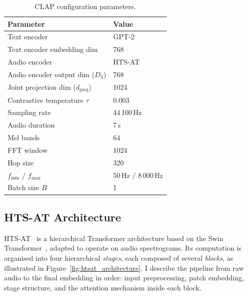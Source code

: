 \begin{table}[h]
\centering
\caption{CLAP configuration parameters.}
\label{tab:clap_config}
\begin{tabular}{ll}
\toprule
\textbf{Parameter} & \textbf{Value} \\
\midrule
Text encoder                               & GPT-2 \\
Text encoder embedding dim                 & 768 \\
Audio encoder                              & HTS-AT \\
Audio encoder output dim ($D_3$)           & 768 \\
Joint projection dim ($d_{\mathrm{proj}}$) & 1024 \\
Contrastive temperature $\tau$             & 0.003 \\
Sampling rate                              & 44\,100\,Hz \\
Audio duration                             & 7\,s \\
Mel bands                                  & 64 \\
FFT window                                 & 1024 \\
Hop size                                   & 320 \\
$f_{\min}$ / $f_{\max}$                    & 50\,Hz / 8\,000\,Hz \\
Batch size $B$                             & 1 \\
\bottomrule
\end{tabular}
\end{table}

\subsection{HTS-AT Architecture}
\label{app:htsat}

HTS-AT~\cite{htsat} is a hierarchical Transformer architecture based on the Swin Transformer~\cite{swin}, 
adapted to operate on audio spectrograms. 
Its computation is organised into four hierarchical
\emph{stages}, each composed of several \emph{blocks}, as illustrated in
Figure~\ref{fig:htsat_architecture}. I describe the pipeline from raw audio
to the final embedding in order: input preprocessing, patch embedding, stage
structure, and the attention mechanism inside each block.

